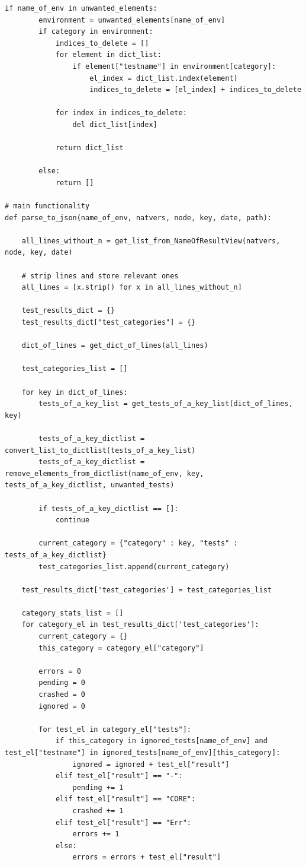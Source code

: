 \begin{lstlisting}[breaklines]
    if name_of_env in unwanted_elements:
        environment = unwanted_elements[name_of_env]
        if category in environment:
            indices_to_delete = []
            for element in dict_list:
                if element["testname"] in environment[category]:
                    el_index = dict_list.index(element)
                    indices_to_delete = [el_index] + indices_to_delete

            for index in indices_to_delete:
                del dict_list[index]

            return dict_list
        
        else:
            return []

# main functionality
def parse_to_json(name_of_env, natvers, node, key, date, path):

    all_lines_without_n = get_list_from_NameOfResultView(natvers, node, key, date)

    # strip lines and store relevant ones
    all_lines = [x.strip() for x in all_lines_without_n]

    test_results_dict = {}
    test_results_dict["test_categories"] = {}

    dict_of_lines = get_dict_of_lines(all_lines)

    test_categories_list = []

    for key in dict_of_lines:
        tests_of_a_key_list = get_tests_of_a_key_list(dict_of_lines, key)

        tests_of_a_key_dictlist = convert_list_to_dictlist(tests_of_a_key_list)
        tests_of_a_key_dictlist = remove_elements_from_dictlist(name_of_env, key, tests_of_a_key_dictlist, unwanted_tests)
        
        if tests_of_a_key_dictlist == []:
            continue

        current_category = {"category" : key, "tests" : tests_of_a_key_dictlist}
        test_categories_list.append(current_category)

    test_results_dict['test_categories'] = test_categories_list

    category_stats_list = []
    for category_el in test_results_dict['test_categories']:
        current_category = {}
        this_category = category_el["category"]

        errors = 0
        pending = 0
        crashed = 0
        ignored = 0

        for test_el in category_el["tests"]:
            if this_category in ignored_tests[name_of_env] and test_el["testname"] in ignored_tests[name_of_env][this_category]:
                ignored = ignored + test_el["result"]
            elif test_el["result"] == "-":
                pending += 1
            elif test_el["result"] == "CORE":
                crashed += 1
            elif test_el["result"] == "Err":
                errors += 1
            else:
                errors = errors + test_el["result"]


\end{lstlisting}
